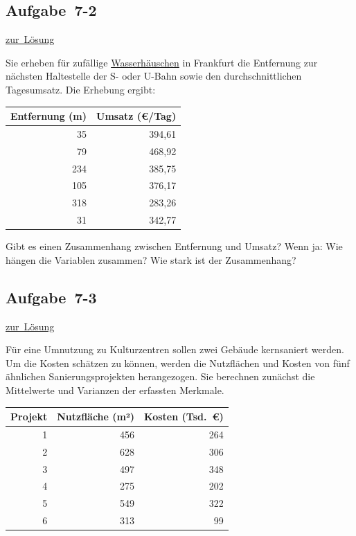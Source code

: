 \documentclass[
  11pt,
  ngerman,
  a4paper,
]{report}
\begin{document}
\hypertarget{aufgabe-7-2}{%
\subsection{Aufgabe~7-2}\label{aufgabe-7-2}}

\protect\hyperlink{loesung-7-2}{zur~Lösung}

Sie erheben für zufällige \href{https://frankfurt.de/frankfurt-entdecken-und-erleben/stadtportrait/typisch-frankfurt/wasserhaeuschen}{Wasserhäuschen} in Frankfurt die Entfernung zur nächsten Haltestelle der S- oder U-Bahn sowie den durchschnittlichen Tagesumsatz. Die Erhebung ergibt:

\begin{table}[H]
\centering
\begin{tabular}{rr}
\toprule
\textbf{Entfernung (m)} & \textbf{Umsatz (€/Tag)}\\
\midrule
35 & 394,61\\
79 & 468,92\\
234 & 385,75\\
105 & 376,17\\
318 & 283,26\\
31 & 342,77\\
\bottomrule
\end{tabular}
\end{table}

Gibt es einen Zusammenhang zwischen Entfernung und Umsatz?
Wenn ja: Wie hängen die Variablen zusammen? Wie stark ist der Zusammenhang?

\hypertarget{aufgabe-7-3}{%
\subsection{Aufgabe~7-3}\label{aufgabe-7-3}}

\protect\hyperlink{loesung-7-3}{zur~Lösung}

Für eine Umnutzung zu Kulturzentren sollen zwei Gebäude kernsaniert werden. Um die Kosten schätzen zu können, werden die Nutzflächen und Kosten von fünf ähnlichen Sanierungsprojekten herangezogen. Sie berechnen zunächst die Mittelwerte und Varianzen der erfassten Merkmale.

\begin{table}[H]
\centering
\begin{tabular}{rrr}
\toprule
\textbf{Projekt} & \textbf{Nutzfläche (m²)} & \textbf{Kosten (Tsd. €)}\\
\midrule
1 & 456 & 264\\
2 & 628 & 306\\
3 & 497 & 348\\
4 & 275 & 202\\
5 & 549 & 322\\
6 & 313 & 99\\
\bottomrule
\end{tabular}
\end{table}
\end{document}
